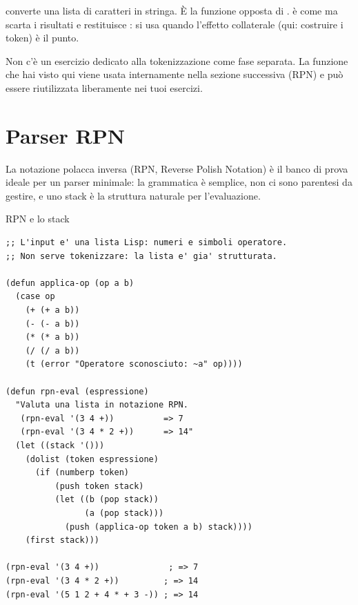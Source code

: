 \begin{nota}
 converte una lista di caratteri
in stringa. È la funzione opposta di .
 è come  ma scarta i risultati
e restituisce : si usa quando l'effetto collaterale
(qui: costruire i token) è il punto.
\end{nota}

\begin{nota}
Non c'è un esercizio dedicato alla tokenizzazione come fase separata.
La funzione  che hai visto qui viene usata internamente
nella sezione successiva (RPN) e può essere riutilizzata liberamente
nei tuoi esercizi.
\end{nota}

\section{Parser RPN}

La notazione polacca inversa (RPN, Reverse Polish Notation)
è il banco di prova ideale per un parser minimale:
la grammatica è semplice, non ci sono parentesi da gestire,
e uno stack è la struttura naturale per l'evaluazione.

\begin{concetto}{RPN e lo stack}
\end{concetto}

\begin{esempio}
\begin{lstlisting}
;; L'input e' una lista Lisp: numeri e simboli operatore.
;; Non serve tokenizzare: la lista e' gia' strutturata.

(defun applica-op (op a b)
  (case op
    (+ (+ a b))
    (- (- a b))
    (* (* a b))
    (/ (/ a b))
    (t (error "Operatore sconosciuto: ~a" op))))

(defun rpn-eval (espressione)
  "Valuta una lista in notazione RPN.
   (rpn-eval '(3 4 +))          => 7
   (rpn-eval '(3 4 * 2 +))      => 14"
  (let ((stack '()))
    (dolist (token espressione)
      (if (numberp token)
          (push token stack)
          (let ((b (pop stack))
                (a (pop stack)))
            (push (applica-op token a b) stack))))
    (first stack)))

(rpn-eval '(3 4 +))              ; => 7
(rpn-eval '(3 4 * 2 +))         ; => 14
(rpn-eval '(5 1 2 + 4 * + 3 -)) ; => 14
\end{lstlisting}
\end{esempio}

